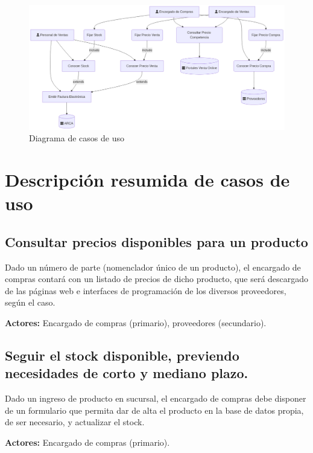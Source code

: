 \begin{figure}[ht]
	\vspace{20pt}
	\centering
	\vspace{15pt}
	\includegraphics[width=\textwidth]{img/01-diagrama-casos-uso}
	\caption{Diagrama de casos de uso}
	\vspace{15pt}
\end{figure}

\pagebreak

\section{Descripción resumida de casos de uso}

\subsection{Consultar precios disponibles para un producto}

Dado un número de parte (nomenclador único de un producto),
el encargado de compras contará con un listado de precios de dicho producto,
que será descargado de las páginas web e interfaces de programación de los diversos proveedores,
según el caso.

\textbf{Actores:} Encargado de compras (primario), proveedores (secundario).

\subsection{Seguir el stock disponible, previendo necesidades de corto y mediano plazo.}

Dado un ingreso de producto en sucursal,
el encargado de compras debe disponer de un formulario que permita dar de alta el producto en la base de datos propia,
de ser necesario,
y actualizar el stock.

\textbf{Actores:} Encargado de compras (primario).

